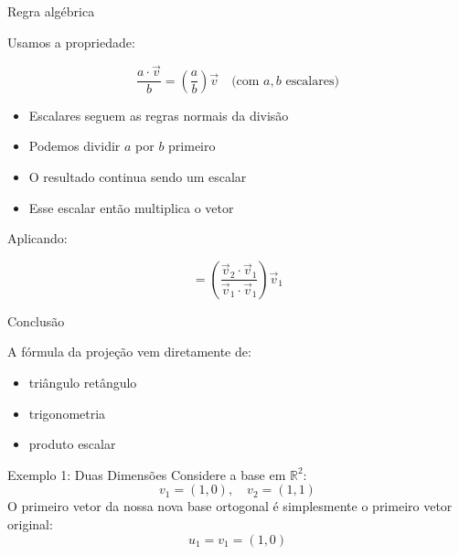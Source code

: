 \documentclass{beamer}
\begin{document}
\begin{frame}{Regra algébrica}


\vspace{0.5cm}

Usamos a propriedade:

\[
\frac{a \cdot \vec{v}}{b} = \left(\frac{a}{b}\right)\vec{v}
\quad \text{(com $a,b$ escalares)}
\]

\vspace{0.5cm}

\begin{itemize}
    \item Escalares seguem as regras normais da divisão
    \item Podemos dividir $a$ por $b$ primeiro
    \item O resultado continua sendo um escalar
\end{itemize}

\vspace{0.5cm}

\begin{itemize}
    \item Esse escalar então multiplica o vetor
\end{itemize}

\vspace{0.5cm}

Aplicando:

\[
=
\left(\frac{\vec{v}_2 \cdot \vec{v}_1}{\vec{v}_1 \cdot \vec{v}_1}\right)\vec{v}_1
\]

\end{frame}
\begin{frame}{Conclusão}

A fórmula da projeção vem diretamente de:
\begin{itemize}
    \item triângulo retângulo
    \item trigonometria
    \item produto escalar
\end{itemize}

\end{frame}
\begin{frame}{Exemplo 1: Duas Dimensões}
Considere a base em $\mathbb{R}^2$:
\[
v_1=(1,0), \quad v_2=(1,1)
\]
O primeiro vetor da nossa nova base ortogonal é simplesmente o primeiro vetor original:
\[
u_1 = v_1 = (1,0)
\]
\end{frame}
\end{document}
